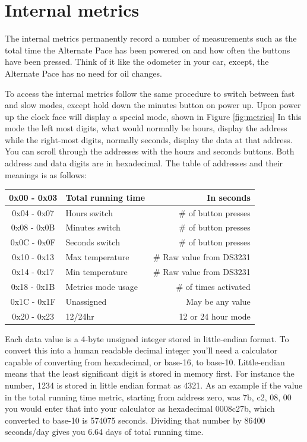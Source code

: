 \documentclass{article}
\begin{document}
\pagebreak

\section{Internal metrics}


The internal metrics permanently record a number of measurements such as the
total time the Alternate Pace has been powered on and how often the buttons
have been pressed. Think of it like the odometer in your car, except, the
Alternate Pace has no need for oil changes.

To access the internal metrics follow the same procedure to switch between fast
and slow modes, except hold down the minutes button on power up. Upon power up
the clock face will display a special mode, shown in Figure \ref{fig:metrics}
In this mode the left most digits, what would normally be hours, display the
address while the right-most digits, normally seconds, display the data at that
address. You can scroll through the addresses with the hours and seconds
buttons. Both address and data digits are in hexadecimal. The table of
addresses and their meanings is as follows:

\medskip

\begin{tabular}{|c|l|r|}
\hline
0x00 - 0x03 & Total running time & In seconds \\ \hline
0x04 - 0x07 & Hours switch & \# of button presses \\ \hline
0x08 - 0x0B & Minutes switch & \# of button presses \\ \hline
0x0C - 0x0F & Seconds switch & \# of button presses \\ \hline
0x10 - 0x13 & Max temperature & \# Raw value from DS3231 \\ \hline
0x14 - 0x17 & Min temperature & \# Raw value from DS3231 \\ \hline
0x18 - 0x1B & Metrics mode usage& \# of times activated\\ \hline
0x1C - 0x1F & Unassigned & May be any value \\ \hline
0x20 - 0x23 & 12/24hr & 12 or 24 hour mode \\ \hline
\end{tabular}

\medskip

Each data value is a 4-byte unsigned integer stored in little-endian format. To
convert this into a human readable decimal integer you'll need a calculator
capable of converting from hexadecimal, or base-16, to base-10. Little-endian
means that the least significant digit is stored in memory first. For instance
the number, 1234 is stored in little endian format as 4321. As an example if
the value in the total running time metric, starting from address zero, was 7b,
c2, 08, 00 you would enter that into your calculator as hexadecimal 0008c27b,
which converted to base-10 is 574075 seconds. Dividing that number by 86400
seconds/day gives you 6.64 days of total running time.
\end{document}
